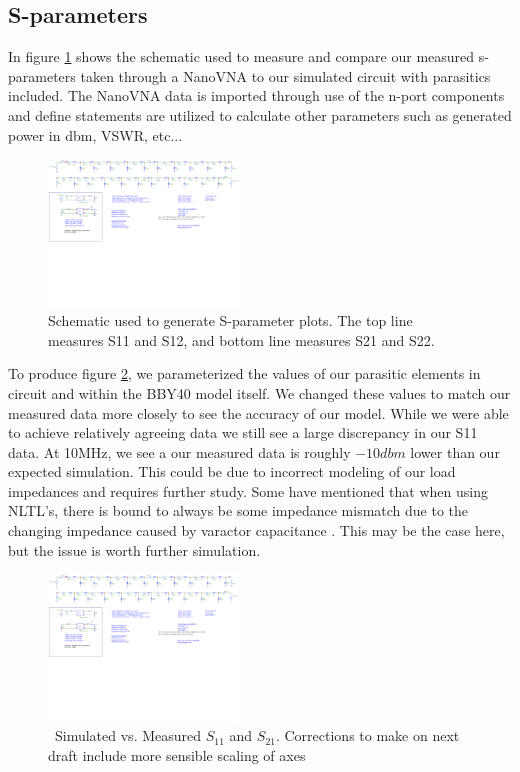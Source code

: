 \documentclass[journal]{IEEEtran}
\begin{document}
\subsection{S-parameters}


In figure \ref{fig:sparamSchem} shows the schematic used to measure and compare our measured s-parameters taken through a NanoVNA to our simulated circuit with parasitics included. The NanoVNA data is imported through use of the n-port components and define statements are utilized to calculate other parameters such as generated power in dbm, VSWR, etc...


\begin{figure}[htb]
\centering
\includegraphics[width=0.45\textwidth,page = 1]{images/MostRecentSparamMeasSchem.pdf}
\caption{Schematic used to generate S-parameter plots. The top line measures S11 and S12, and bottom line measures S21 and S22. 
}\label{fig:sparamSchem}
\end{figure}


To produce figure \ref{fig:S11_S21}, we parameterized the values of our parasitic elements in circuit and within the BBY40 model itself. We changed these values to match our measured data more closely to see the accuracy of our model. While we were able to achieve relatively agreeing data we still see a large discrepancy in our S11 data. At 10MHz, we see a our measured data is roughly $-10dbm$ lower than our expected simulation. This could be due to incorrect modeling of our load impedances and requires further study. Some have mentioned that when using NLTL's, there is bound to always be some impedance mismatch due to the changing impedance caused by varactor capacitance \cite{wilson1991pulse}. This may be the case here, but the issue is worth further simulation.

\begin{figure}[htb]
\centering
\includegraphics[width=0.45\textwidth,page = 2]{Fixed_ZeroBias_Sparam_Sims.pdf}
\caption{\ Simulated vs. Measured $S_{11}$ and $S_{21}$. Corrections to make on next draft include more sensible scaling of axes
}\label{fig:S11_S21}
\end{figure}
\end{document}
